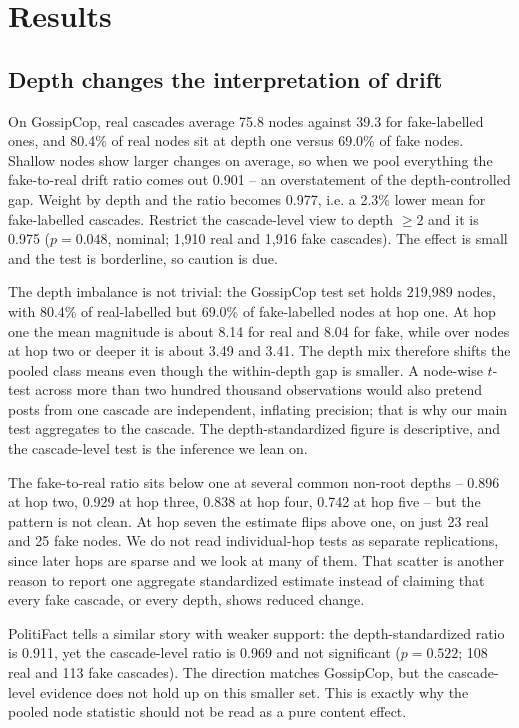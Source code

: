 \documentclass[conference]{IEEEtran}
\begin{document}
\section{Results}
\subsection{Depth changes the interpretation of drift}
On GossipCop, real cascades average 75.8 nodes against 39.3 for fake-labelled
ones, and 80.4\% of real nodes sit at depth one versus 69.0\% of fake nodes.
Shallow nodes show larger changes on average, so when we pool everything the
fake-to-real drift ratio comes out 0.901 -- an overstatement of the
depth-controlled gap. Weight by depth and the ratio becomes 0.977, i.e. a 2.3\%
lower mean for fake-labelled cascades. Restrict the cascade-level view to depth
$\geq2$ and it is 0.975 ($p=0.048$, nominal; 1,910 real and 1,916 fake
cascades). The effect is small and the test is borderline, so caution is due.

The depth imbalance is not trivial: the GossipCop test set holds 219,989 nodes,
with 80.4\% of real-labelled but 69.0\% of fake-labelled nodes at hop one. At
hop one the mean magnitude is about 8.14 for real and 8.04 for fake, while over
nodes at hop two or deeper it is about 3.49 and 3.41. The depth mix therefore
shifts the pooled class means even though the within-depth gap is smaller. A
node-wise $t$-test across more than two hundred thousand observations would also
pretend posts from one cascade are independent, inflating precision; that is why
our main test aggregates to the cascade. The depth-standardized figure is
descriptive, and the cascade-level test is the inference we lean on.

The fake-to-real ratio sits below one at several common non-root depths -- 0.896
at hop two, 0.929 at hop three, 0.838 at hop four, 0.742 at hop five -- but the
pattern is not clean. At hop seven the estimate flips above one, on just 23 real
and 25 fake nodes. We do not read individual-hop tests as separate replications,
since later hops are sparse and we look at many of them. That scatter is another
reason to report one aggregate standardized estimate instead of claiming that
every fake cascade, or every depth, shows reduced change.

PolitiFact tells a similar story with weaker support: the depth-standardized
ratio is 0.911, yet the cascade-level ratio is 0.969 and not significant
($p=0.522$; 108 real and 113 fake cascades). The direction matches GossipCop,
but the cascade-level evidence does not hold up on this smaller set. This is
exactly why the pooled node statistic should not be read as a pure content
effect.
\end{document}
